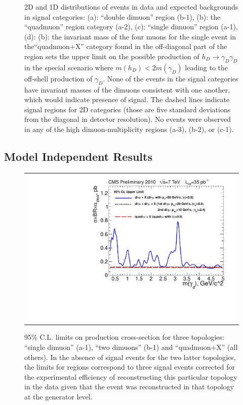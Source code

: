 \begin{figure}[tbh]
\begin{tabular}{cc}
\end{tabular}
\caption{2D and 1D distributions of events in data and expected backgrounds in signal categories: (a): ``double dimuon'' region (b-1), (b): the ``quadmuon'' region category (a-2), (c): ``single dimuon'' region (a-1), (d): (b): the invariant mass of the four muons for the single event in the``quadmuon+X'' category found in the off-diagonal part of the region sets the upper limit on the possible production of $h_D \to \gamma_D \gamma_D$ in the special scenario where $m(h_D)<2 m(\gamma_D)$ leading to the off-shell production of $\gamma_D$. None of the events in the signal categories have invariant masses of the dimuons consistent with one another, which would indicate presence of signal. The dashed lines indicate signal regions for 2D categories (those are five standard deviations from the diagonal in detector resolution). No events were observed in any of the high dimuon-multiplicity regions (a-3), (b-2), or (c-1). \label{fig:signalregion_events}}
\end{figure}

\subsection{Model Independent Results}
\begin{figure}[tbh]
\centering
\begin{tabular}{c}
\includegraphics[width=0.65\linewidth]{PLOTS/ul__model_indep_sys.pdf} \\
\end{tabular}
\caption{95\% C.L. limits on production cross-section for three topologies: ``single dimuon'' (a-1),  ``two dimuons'' (b-1) and ``quadmuon+X'' (all others). In the absence of signal events for the two latter topologies, the limits for regions correspond to three signal events corrected for the experimental efficiency of reconstructing this particular topology in the data given that the event was reconstructed in that topology at the generator level. \label{fig:signalregion_limits}}
\end{figure}

